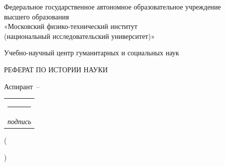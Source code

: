 \newcommand{\ReportBlank}[2]{%
    \makebox[#1][c]{\strut #2\hfill}\llap{\rule{#1}{0.4pt}}%
}

\begin{titlepage}
    \thispagestyle{empty}
    \setlength{\parindent}{0pt}
    \setlength{\parskip}{0pt}
    \fontsize{14}{16.1}\selectfont

    \begin{center}
        Федеральное государственное автономное образовательное учреждение\\
        высшего образования\\
        «Московский физико-технический институт\\
        (национальный исследовательский университет)»

        \vspace{14.5mm}
        Учебно-научный центр гуманитарных и социальных наук

        \vspace{29mm}
        РЕФЕРАТ ПО ИСТОРИИ НАУКИ

        \vspace{14.5mm}
        {\fontsize{20}{23}\selectfont\bfseries \ReportTopic\par}
    \end{center}

    \vspace{22mm}

    \begin{flushright}
        \begin{minipage}{152mm}
            \raggedleft
            Аспирант~–~%
            \begin{tabular}[t]{@{}c@{}}
                \rule{36mm}{0.4pt}\\[-1mm]
                {\fontsize{9}{10.4}\selectfont\itshape подпись}
            \end{tabular}%
            \enspace\ReportAuthor\par

            \vspace{1mm}
            (\ReportBlank{115mm}{\ReportGroupAndProgramme}\par
            {\fontsize{9}{10.4}\selectfont\itshape
                \par}
            \ReportBlank{115mm}{\ReportSpecialty})\par
            {\fontsize{9}{10.4}\selectfont\itshape
                \par}


\end{minipage}
\end{flushright}
\end{titlepage}
